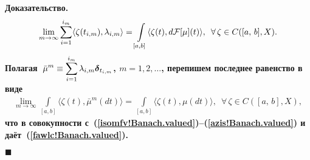 \documentclass{report}
\newenvironment{Proof}{\par\noindent\bf Доказательство.\rm}{ $\blacksquare$\par}
\newcommand{\mydelta}{\text{\mathversion{bold}$\delta$\mathversion{normal}}}
\begin{document}
\begin{Proof}
\begin{gather*}
\displaystyle\lim\limits_{m\to\infty}\sum\limits_{i=1}^{i_m}\langle\zeta(t_{i,m}),\lambda_{i,m}\rangle= \int\limits_{[a,b]}\langle\zeta(t),d{\cal F}[\mu](t)\rangle,\,\,\,
\forall\,\zeta \in C([a,\,b],X).
\end{gather*}
Полагая~$\displaystyle\bar{\mu}^m\equiv\sum\limits_{i=1}^{i_m} \lambda_{i,m}\mydelta_{t_{i,m}}$, $m=1,2,\dots$, перепишем последнее равенство в виде
\begin{gather*}
\lim\limits_{m\to\infty}\int\limits_{[a,b]}\langle\zeta(t),\bar{\mu}^m(dt)\rangle= \int\limits_{[a,b]}\langle\zeta(t),{\mu}(dt)\rangle,\,\,\,\forall\,\zeta\in C([a,\,b],X),
\end{gather*}
что в совокупности с~(\ref{isomfv!Banach.valued})--(\ref{azis!Banach.valued}) и даёт~(\ref{fawlc!Banach.valued}).



\end{Proof}
\end{document}

